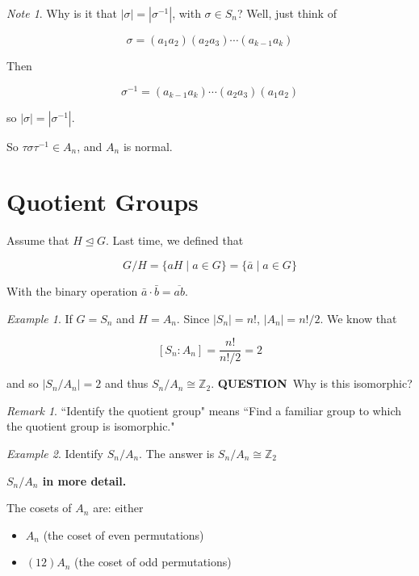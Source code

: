 \documentclass[12pt]{article}
\def\Z{{\mathbb Z}}
\def\QUESTION{\color{red}\textbf{QUESTION}\color{black}\,}
\theoremstyle{remark}
\theoremstyle{remark}
\theoremstyle{remark}
\newtheorem{example}{Example}
\theoremstyle{remark}
\newtheorem*{remark}{Remark}
\theoremstyle{remark}
\newtheorem*{note}{Note}
\begin{document}
\begin{note}
  Why is it that $|\sigma| = |\sigma^{-1}|$, with $\sigma \in S_n$? Well, just
  think of

  \[
    \sigma = (a_1 a_2)(a_2 a_3) \cdots (a_{k  - 1} a_k)
  \]

  Then

  \[
    \sigma^{-1} = (a_{k - 1} a_k) \cdots (a_2 a_3)(a_1 a_2)
  \]

  so $|\sigma| = |\sigma^{-1}|$.
\end{note}

So $\tau \sigma \tau^{-1} \in A_n$, and $A_n$ is normal.

\section{Quotient Groups}

Assume that $H \trianglelefteq G$. Last time, we defined that

\[
  G / H = \{aH \mid a \in G\} = \{\bar a \mid a \in G \}
\]

With the binary operation $\bar a \cdot \bar b = \overline{ab}$.

\begin{example}
  If $G = S_n$ and $H = A_n$. Since $|S_n| = n!$, $|A_n| = n! / 2$. We know that

  \[
    [S_n : A_n] = \frac{n!}{n! / 2} = 2
  \]

  and so $|S_n / A_n| = 2$ and thus $S_n / A_n \cong \Z_2$. \QUESTION{} Why is this
  isomorphic?
\end{example}

\begin{remark}
  ``Identify the quotient group" means ``Find a familiar group to
  which the quotient group is isomorphic."
\end{remark}

\begin{example}
  Identify $S_n / A_n$. The answer is $S_n / A_n \cong \Z_2$
\end{example}

{\bf $S_n / A_n$ in more detail.}

The cosets of $A_n$ are: either

\begin{itemize}
  \item $A_n$ (the coset of even permutations)
  \item $(12)A_n$ (the coset of odd permutations)
\end{itemize}
\end{document}
